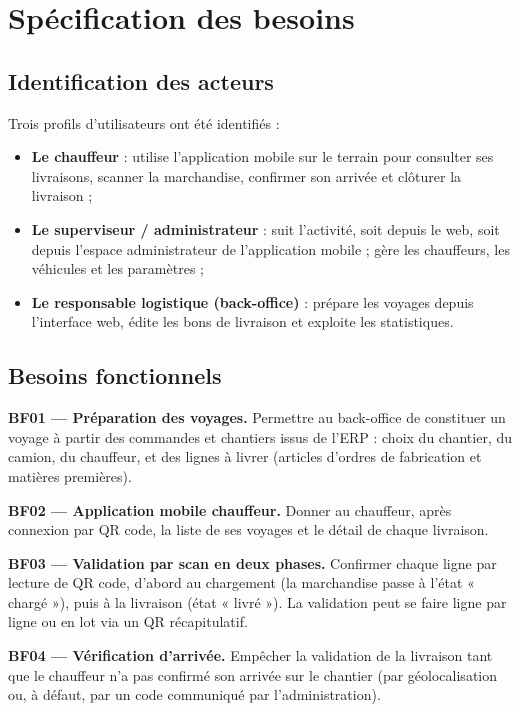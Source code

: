 \documentclass[12pt,a4paper]{report}
\begin{document}
\section{Spécification des besoins}

\subsection{Identification des acteurs}

Trois profils d'utilisateurs ont été identifiés :

\begin{itemize}
\item \textbf{Le chauffeur} : utilise l'application mobile sur le terrain pour consulter ses livraisons, scanner la marchandise, confirmer son arrivée et clôturer la livraison ;
\item \textbf{Le superviseur / administrateur} : suit l'activité, soit depuis le web, soit depuis l'espace administrateur de l'application mobile ; gère les chauffeurs, les véhicules et les paramètres ;
\item \textbf{Le responsable logistique (back-office)} : prépare les voyages depuis l'interface web, édite les bons de livraison et exploite les statistiques.
\end{itemize}

\subsection{Besoins fonctionnels}

\textbf{BF01 — Préparation des voyages.} Permettre au back-office de constituer un voyage à partir des commandes et chantiers issus de l'ERP : choix du chantier, du camion, du chauffeur, et des lignes à livrer (articles d'ordres de fabrication et matières premières).

\textbf{BF02 — Application mobile chauffeur.} Donner au chauffeur, après connexion par QR code, la liste de ses voyages et le détail de chaque livraison.

\textbf{BF03 — Validation par scan en deux phases.} Confirmer chaque ligne par lecture de QR code, d'abord au chargement (la marchandise passe à l'état « chargé »), puis à la livraison (état « livré »). La validation peut se faire ligne par ligne ou en lot via un QR récapitulatif.

\textbf{BF04 — Vérification d'arrivée.} Empêcher la validation de la livraison tant que le chauffeur n'a pas confirmé son arrivée sur le chantier (par géolocalisation ou, à défaut, par un code communiqué par l'administration).
\end{document}

